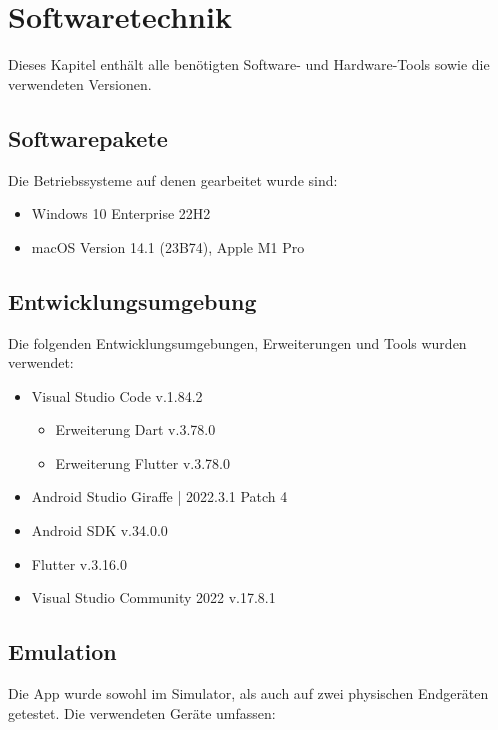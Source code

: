 
\chapter{Softwaretechnik}

Dieses Kapitel enthält alle benötigten Software- und Hardware-Tools sowie die verwendeten Versionen.

\section{Softwarepakete}

Die Betriebssysteme auf denen gearbeitet wurde sind:

\begin{itemize}
  \item Windows 10 Enterprise 22H2
  \item macOS Version 14.1 (23B74), Apple M1 Pro
\end{itemize}

\section{Entwicklungsumgebung}

Die folgenden Entwicklungsumgebungen, Erweiterungen und Tools wurden verwendet:

\begin{itemize}
  \item Visual Studio Code v.1.84.2
  \begin{itemize}
    \item Erweiterung Dart v.3.78.0
    \item Erweiterung Flutter v.3.78.0
  \end{itemize}
  \item Android Studio Giraffe | 2022.3.1 Patch 4
  \item Android SDK v.34.0.0
  \item Flutter v.3.16.0
  \item Visual Studio Community 2022 v.17.8.1
\end{itemize}


\section{Emulation}

Die App wurde sowohl im Simulator, als auch auf zwei physischen Endgeräten getestet.
Die verwendeten Geräte umfassen:

